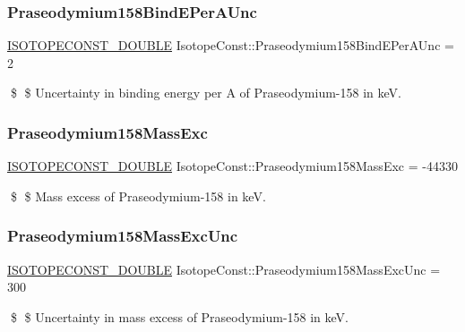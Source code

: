 \subsubsection{\texorpdfstring{Praseodymium158\+Bind\+E\+Per\+A\+Unc}{Praseodymium158BindEPerAUnc}}
{\footnotesize\ttfamily \mbox{\hyperlink{group___isotope_const-_macros_ga8f45a7272ce02c0b4c65c44636ed719a}{I\+S\+O\+T\+O\+P\+E\+C\+O\+N\+S\+T\+\_\+\+D\+O\+U\+B\+LE}} Isotope\+Const\+::\+Praseodymium158\+Bind\+E\+Per\+A\+Unc = 2}

\$ \$ Uncertainty in binding energy per A of Praseodymium-\/158 in keV. \mbox{\label{group___isotope_const-_praseodymium-_pr158_ga8a83a7607b4c80c02d9fededa6e7cf62}} 
\subsubsection{\texorpdfstring{Praseodymium158\+Mass\+Exc}{Praseodymium158MassExc}}
{\footnotesize\ttfamily \mbox{\hyperlink{group___isotope_const-_macros_ga8f45a7272ce02c0b4c65c44636ed719a}{I\+S\+O\+T\+O\+P\+E\+C\+O\+N\+S\+T\+\_\+\+D\+O\+U\+B\+LE}} Isotope\+Const\+::\+Praseodymium158\+Mass\+Exc = -\/44330}

\$ \$ Mass excess of Praseodymium-\/158 in keV. \mbox{\label{group___isotope_const-_praseodymium-_pr158_gafc1a418cbf7eb8d79c97c4029f903be5}} 
\subsubsection{\texorpdfstring{Praseodymium158\+Mass\+Exc\+Unc}{Praseodymium158MassExcUnc}}
{\footnotesize\ttfamily \mbox{\hyperlink{group___isotope_const-_macros_ga8f45a7272ce02c0b4c65c44636ed719a}{I\+S\+O\+T\+O\+P\+E\+C\+O\+N\+S\+T\+\_\+\+D\+O\+U\+B\+LE}} Isotope\+Const\+::\+Praseodymium158\+Mass\+Exc\+Unc = 300}

\$ \$ Uncertainty in mass excess of Praseodymium-\/158 in keV. \mbox{\label{group___isotope_const-_praseodymium-_pr158_ga1643f275dcd857b2c5a684f2f9e751f9}} 
